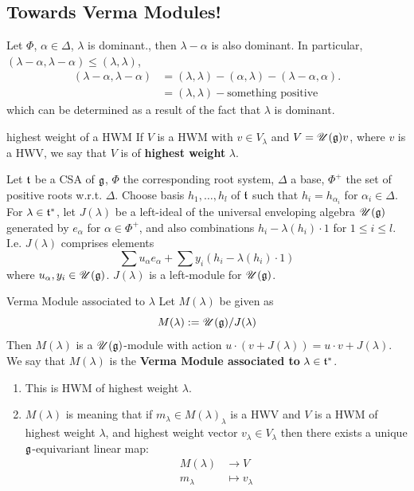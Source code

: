 \documentclass{article}
\begin{document}
\subsection{Towards Verma Modules!}
Let $\Phi$, $\alpha \in \Delta$, $\lambda$ is dominant., then $\lambda - \alpha$ is also dominant. In particular, $(\lambda-\alpha, \lambda - \alpha) \leq(\lambda, \lambda)$, \begin{align*}
    (\lambda - \alpha, \lambda - \alpha) &= (\lambda, \lambda) - (\alpha, \lambda) - (\lambda - \alpha, \alpha).\\
    &= (\lambda, \lambda) - \text{something positive}
\end{align*}
which can be determined as a result of the fact that $\lambda$ is dominant. \begin{fancydefine}{highest weight of a HWM}
    If $V$ is a HWM with $v \in V_{\lambda}$ and $V = \mathscr{U}(\mathfrak{g})v$, where $v$ is a HWV, we say that $V$ is of \textbf{highest weight} $\lambda$.
\end{fancydefine}
Let $\mathfrak{t}$ be a CSA of $\mathfrak{g}$, $\Phi$ the corresponding root system, $\Delta$ a base, $\Phi^{+}$ the set of positive roots w.r.t. $\Delta$. Choose basis $h_{1}, \dots, h_{l}$ of $\mathfrak{t}$ such that $h_{i} = h_{\alpha_{i}}$ for $\alpha_{i} \in \Delta$. For $\lambda \in \mathfrak{t}^{*}$, let $J(\lambda)$ be a left-ideal of the universal enveloping algebra $\mathscr{U}(\mathfrak{g})$ generated by $e_{\alpha}$ for $\alpha \in \Phi^{+}$, and also combinations $h_{i} - \lambda(h_{i})\cdot 1$ for $1 \leq i \leq l$. I.e. $J(\lambda)$ comprises elements \[ \sum u_{\alpha} e_{\alpha} + \sum y_{i}(h_{i} - \lambda(h_{i}) \cdot 1)\] where $u_{\alpha}, y_{i} \in \mathscr{U}(\mathfrak{g})$. $J(\lambda)$ is a left-module for $\mathscr{U}(\mathfrak{g})$.
\begin{fancydefine}{Verma Module associated to $\lambda$}
    Let $M(\lambda)$ be given as \[ M(\lambda) := \mathscr{U}(\mathfrak{g}) / J(\lambda)\]
    Then $M(\lambda)$ is a $\mathscr{U}(\mathfrak{g})$-module with action $u \cdot (v + J(\lambda)) = u\cdot v + J(\lambda)$. We say that $M(\lambda)$ is the \textbf{Verma Module associated to} $\lambda \in \mathfrak{t}^{*}$.
\end{fancydefine}
\begin{fancyprop}{} \hspace{0.1cm}
    \begin{enumerate}
        \item This is HWM of highest weight $\lambda$.
        \item $M(\lambda)$ is  meaning that if $m_{\lambda} \in M(\lambda)_{\lambda}$ is a HWV and $V$ is a HWM of highest weight $\lambda$, and highest weight vector $v_{\lambda} \in V_{\lambda}$ then there exists a unique $\mathfrak{g}$-equivariant linear map: \begin{align*}
            M(\lambda) &\to V\\
            m_{\lambda}&\mapsto v_{\lambda}
        \end{align*}
    \end{enumerate}
\end{fancyprop}
\end{document}
